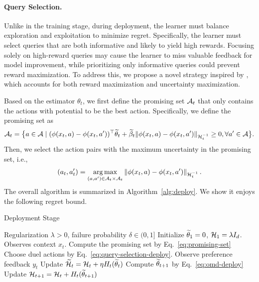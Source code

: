 \paragraph{Query Selection.} Unlike in the training stage, during deployment, the learner must balance exploration and exploitation to minimize regret. Specifically, the learner must select queries that are both informative and likely to yield high rewards. Focusing solely on high-reward queries may cause the learner to miss valuable feedback for model improvement, while prioritizing only informative queries could prevent reward maximization. To address this, we propose a novel strategy inspired by \citet{NeurIPS'21:Saha-Preference-bandits}, which accounts for both reward maximization and uncertainty maximization.

Based on the estimator $\theta_t$, we first define the promising set $\mathcal{A}_t$ that only contains the actions with potential to be the best action. Specifically, we define the promising set as
\begin{align}
    \mathcal{A}_t = \big \{ a \in \mathcal{A} \mid (\phi(x_t, a) - \phi(x_t, a'))^{\top} \widetilde{\theta}_t + \widetilde{\beta}_t \lVert\phi(x_t, a) - \phi(x_t, a')\rVert_{\mathcal{H}_t^{-1}} \geq 0, \forall a' \in \mathcal{A} \big\}.\label{eq:promising-set}
\end{align}
Then, we select the action pairs with the maximum uncertainty in the promising set, i.e.,
\begin{align}
    \label{eq:query-selection-deploy}
    (a_t, a_t') = \operatorname*{arg\,max}_{(a, a') \in \mathcal{A}_t \times \mathcal{A}_t} \left\|\phi(x_t, a)-\phi(x_t, a')\right\|_{\mathcal{H}_t^{-1}}.
\end{align}
The overall algorithm is summarized in Algorithm~\ref{alg:deploy}. We show it enjoys the following regret bound.


\begin{algorithm}[!t]
    \caption{Deployment Stage}
    \label{alg:deploy}
    \begin{algorithmic}[1]
        \REQUIRE Regularization $\lambda>0$, failure probability $\delta \in(0,1]$
        \STATE Initialize $\widetilde{\theta}_1=0$, $\mathcal{H}_1 = \lambda I_d$.
        \STATE Observes context $x_t$.
        \STATE Compute the promising set by Eq.~\eqref{eq:promising-set}
        \STATE Choose duel actions by Eq.~\eqref{eq:query-selection-deploy}.
        \STATE Observe preference feedback $y_t$
        \STATE Update $\widetilde{\mathcal{H}}_t = \mathcal{H}_t + \eta H_t(\widetilde{\theta}_t)$
        \STATE Compute $\widetilde{\theta}_{t+1}$ by Eq.~\eqref{eq:omd-deploy}
        \STATE Update $\mathcal{H}_{t+1} = \mathcal{H}_{t} + H_t(\widetilde{\theta}_{t+1})$
        \ENDFOR
    \end{algorithmic}
\end{algorithm}

